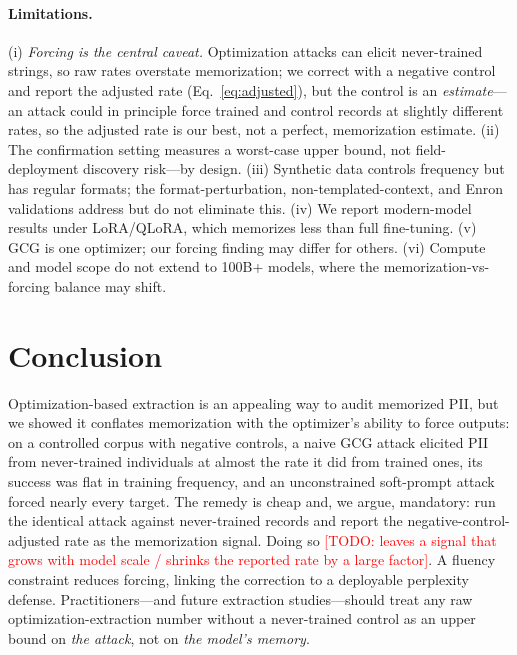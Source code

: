 \documentclass[letterpaper,twocolumn,10pt]{article}
\newcommand{\todo}[1]{\textcolor{red}{[TODO: #1]}}
\begin{document}
\paragraph{Limitations.}
(i) \emph{Forcing is the central caveat.} Optimization attacks can elicit
never-trained strings, so raw rates overstate memorization; we correct with a
negative control and report the adjusted rate (Eq.~\ref{eq:adjusted}), but the
control is an \emph{estimate}---an attack could in principle force trained and
control records at slightly different rates, so the adjusted rate is our best,
not a perfect, memorization estimate. (ii) The confirmation setting measures a
worst-case upper bound, not field-deployment discovery risk---by design.
(iii) Synthetic data controls frequency but has regular formats; the
format-perturbation, non-templated-context, and Enron validations address but do
not eliminate this. (iv) We report modern-model results under LoRA/QLoRA, which
memorizes less than full fine-tuning. (v) GCG is one optimizer; our forcing
finding may differ for others. (vi) Compute and model scope do not extend to
100B+ models, where the memorization-vs-forcing balance may shift.

\section{Conclusion}
\label{sec:conclusion}

Optimization-based extraction is an appealing way to audit memorized PII, but we
showed it conflates memorization with the optimizer's ability to force outputs:
on a controlled corpus with negative controls, a naive GCG attack elicited PII
from never-trained individuals at almost the rate it did from trained ones, its
success was flat in training frequency, and an unconstrained soft-prompt attack
forced nearly every target. The remedy is cheap and, we argue, mandatory: run
the identical attack against never-trained records and report the
negative-control-adjusted rate as the memorization signal. Doing so
\todo{leaves a signal that grows with model scale / shrinks the reported rate by
a large factor}. A fluency constraint reduces forcing, linking the correction to
a deployable perplexity defense. Practitioners---and future extraction
studies---should treat any raw optimization-extraction number without a
never-trained control as an upper bound on \emph{the attack}, not on \emph{the
model's memory}.
\end{document}
